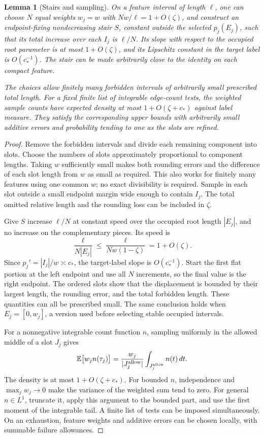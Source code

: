 \documentclass[11pt]{article}
\numberwithin{equation}{section}
\newtheorem{lemma}[theorem]{Lemma}
\theoremstyle{definition}
\theoremstyle{remark}
\begin{document}
\begin{lemma}[Stairs and sampling]\label{wl:stairs}
On a feature interval of length $\ell$, one can choose $N$ equal
weights $w_j=w$ with $Nw/\ell=1+O(\zeta)$, and construct an
endpoint-fixing nondecreasing stair $S$, constant outside the selected
$p_j(E_j)$, such that its total increase over each $I_j$ is $\ell/N$.
Its slope with respect to the occupied root parameter is at most
$1+O(\zeta)$, and its Lipschitz constant in the target label is
$O(c_*^{-1})$.  The stair can be made arbitrarily close to the identity
on each compact feature.

The choices allow finitely many forbidden intervals of arbitrarily
small prescribed total length.  For a fixed finite list of integrable
edge-count tests, the weighted sample counts have expected density at
most $1+O(\zeta+c_*)$ against label measure.  They satisfy the
corresponding upper bounds with arbitrarily small additive errors and
probability tending to one as the slots are refined.
\end{lemma}

\begin{proof}
Remove the forbidden intervals and divide each remaining component
into slots.  Choose the numbers of slots approximately proportional to
component lengths.  Taking $w$ sufficiently small makes both rounding
errors and the difference of each slot length from $w$ as small as
required.  This also works for finitely many features using one common
$w$; no exact divisibility is required.  Sample in each slot outside a
small endpoint margin wide enough to contain $I_j$.  The total omitted
relative length and the rounding loss can be included in $\zeta$.

Give $S$ increase $\ell/N$ at constant speed over the occupied
root length $|E_j|$, and no increase on the complementary pieces.
Its speed is
\[
 \frac{\ell}{N|E_j|}\leq
 \frac{\ell}{Nw(1-\zeta)}=1+O(\zeta).
\]
Since $p_j'=|I_j|/w\asymp c_*$, the target-label slope is
$O(c_*^{-1})$.  Start the first flat portion at the left endpoint and
use all $N$ increments, so the final value is the right endpoint.
The ordered slots show that the displacement is bounded by their
largest length, the rounding error, and the total forbidden length.
These quantities can all be prescribed small.  The same conclusion
holds when $E_j=[0,w_j]$, a version used before selecting stable
occupied intervals.

For a nonnegative integrable count function $n$, sampling uniformly in
the allowed middle of a slot $J_j$ gives
\[
 \mathbb E\bigl[w_j n(\tau_j)\bigr]
 =\frac{w_j}{|J_j^{\rm allow}|}
       \int_{J_j^{\rm allow}}n(t)\,dt.
\]
The density is at most $1+O(\zeta+c_*)$.  For bounded $n$, independence
and $\max_jw_j\to0$ make the variance of the weighted sum tend to
zero.  For general $n\in L^1$, truncate it, apply this argument to the
bounded part, and use the first moment of the integrable tail.  A
finite list of tests can be imposed simultaneously.  On an exhaustion,
feature weights and additive errors can be chosen locally, with
summable failure allowances.
\end{proof}
\end{document}
